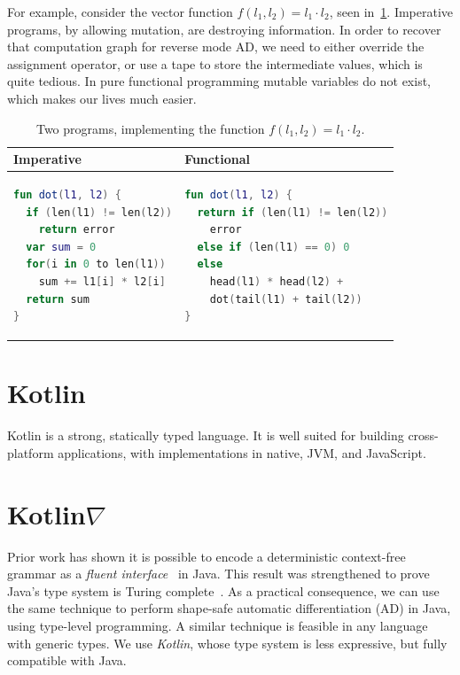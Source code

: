 \documentclass[12pt,initial,twoside,maitrise]{dms}
\numberwithin{equation}{section}
\numberwithin{table}{chapter}
\numberwithin{figure}{chapter}
\begin{document}
For example, consider the vector function $f(l_1, l_2) = l_1 \cdot l_2$, seen in~\ref{tab:1}. Imperative programs, by allowing mutation, are destroying information. In order to recover that computation graph for reverse mode AD, we need to either override the assignment operator, or use a tape to store the intermediate values, which is quite tedious. In pure functional programming mutable variables do not exist, which makes our lives much easier.

\begin{table}[t]
    \centering
    \begin{tabular}{|l|l|}
        \hline
        Imperative & Functional \\
        \hline
        \begin{lstlisting}[language=Kotlin]
fun dot(l1, l2) {
  if (len(l1) != len(l2))
    return error
  var sum = 0
  for(i in 0 to len(l1))
    sum += l1[i] * l2[i]
  return sum
}
        \end{lstlisting}
         &
        \begin{lstlisting}[language=Kotlin]
fun dot(l1, l2) {
  return if (len(l1) != len(l2))
    error
  else if (len(l1) == 0) 0
  else
    head(l1) * head(l2) +
    dot(tail(l1) + tail(l2))
}
        \end{lstlisting} \\
        \hline
    \end{tabular}
    \caption{Two programs, implementing the function $f(l_1, l_2) = l_1 \cdot l_2$.}
    \label{tab:1}
\end{table}

\section{Kotlin}

Kotlin is a strong, statically typed language. It is well suited for building cross-platform applications, with implementations in native, JVM, and JavaScript.

\section{Kotlin$\nabla$}

Prior work has shown it is possible to encode a deterministic context-free grammar as a \textit{fluent interface}~\cite{gil2016formal} in Java. This result was strengthened to prove Java's type system is Turing complete~\cite{Grigore:2017:JGT:3009837.3009871}. As a practical consequence, we can use the same technique to perform shape-safe automatic differentiation (AD) in Java, using type-level programming. A similar technique is feasible in any language with generic types. We use \textit{Kotlin}, whose type system is less expressive, but fully compatible with Java.
\end{document}
